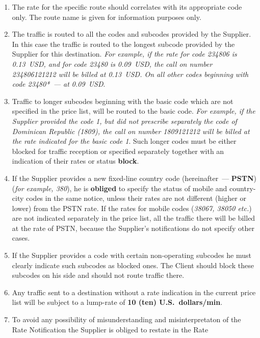 \begin{Form}
\begin{enumerate}[label=\thesection.\arabic*.]
    \item  \label{enu:2.2-en}The rate for the specific route should correlates with its
      appropriate code only.
      The route name is given for information purposes only. 
    \item The traffic is routed to all the codes and subcodes provided by the
      Supplier.
      In this case the traffic is routed to the longest subcode provided by the
      Supplier for this destination. \textit{For example, if the rate for code 234806
      is 0.13~USD, and for code 23480 is 0.09~USD, the call on number
      234806121212 will be billed at 0.13~USD.
      On all other codes beginning with code 23480{*}~--- at 0.09~USD}.
    \item Traffic to longer subcodes beginning with the basic code which are
      not specified in the price list, will be routed to the basic code.
      \textit{For example, if the Supplier provided the code 1, but did not
      prescribe separately the code of Dominican Republic (1809), the call on
      number 1809121212 will be billed at the rate indicated for the
      basic code 1}. Such longer codes must be either blocked for
      traffic reception or specified separately together with an indication of
      their rates or status \textbf{\flqq{}block\frqq{}}.
    \item If the Supplier provides a new fix\-ed-li\-ne country code
      (hereinafter~--- \textbf{\flqq{}PSTN\frqq{}}) (\textit{for example,
      380}), he is \textbf{obliged} to specify the status of mobile and
      co\-un\-try-ci\-ty codes in the same notice, unless their rates are not
      different (higher or lower) from the PSTN rate. If the rates for mobile
      codes  (\textit{38067, 38050 etc.}) are not indicated separately
      in the price list, all the traffic there will be billed at the rate of
      PSTN, because the Supplier's notifications do not specify other cases. 
    \item If the Supplier provides a code with certain non-op\-er\-at\-ing subcodes
      he must clearly indicate such subcodes as blocked ones. The Client should 
      block these subcodes on his side and should not route traffic there. 
    \item Any traffic sent to a destination without a rate indication in the
      current price list will be subject to a lump-ra\-te of \textbf{10 (ten) U.S.~dollars/min}.
    \item To avoid any possibility of misunderstanding and misinterpretaton of
      the Rate Notification the Supplier is obliged to restate in the Rate

\end{enumerate}
\end{Form}
